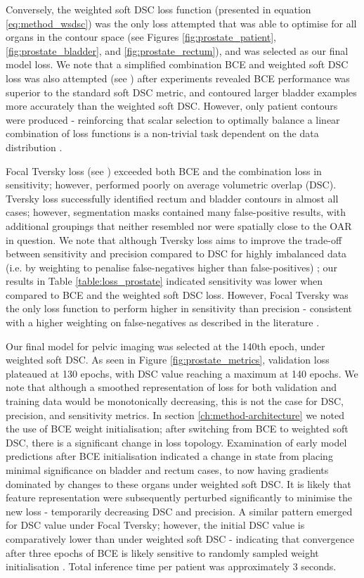 Conversely, the weighted soft DSC loss function (presented in equation \ref{eq:method_wsdsc}) was the only loss attempted that was able to optimise for all organs in the contour space (see Figures \ref{fig:prostate_patient}, \ref{fig:prostate_bladder}, and \ref{fig:prostate_rectum}), and was selected as our final model loss. We note that a simplified combination BCE and weighted soft DSC loss was also attempted (see \cite{taghanaki2018}) after experiments revealed BCE performance was superior to the standard soft DSC metric, and contoured larger bladder examples more accurately than the weighted soft DSC. However, only patient contours were produced - reinforcing that scalar selection to optimally balance a linear combination of loss functions is a non-trivial task dependent on the data distribution \cite{Bertels2019}. 
 
Focal Tversky loss (see \cite{Khan2019}) exceeded both BCE and the combination loss in sensitivity; however, performed poorly on average volumetric overlap (DSC). Tversky loss successfully identified rectum and bladder contours in almost all cases; however, segmentation masks contained many false-positive results, with additional groupings that neither resembled nor were spatially close to the OAR in question. We note that although Tversky loss aims to improve the trade-off between sensitivity and precision compared to DSC for highly imbalanced data (i.e. by weighting to penalise false-negatives higher than false-positives) \cite{taghanaki2018}; our results in Table \ref{table:loss_prostate} indicated sensitivity was lower when compared to BCE and the weighted soft DSC loss. However, Focal Tversky was the only loss function to perform higher in sensitivity than precision - consistent with a higher weighting on false-negatives as described in the literature \cite{Khan2019}.



Our final model for pelvic imaging was selected at the 140th epoch, under weighted soft DSC. As seen in Figure \ref{fig:prostate_metrics}, validation loss plateaued at 130 epochs, with DSC value reaching a maximum at 140 epochs. We note that although a smoothed representation of loss for both validation and training data would be monotonically decreasing, this is not the case for DSC, precision, and sensitivity metrics. In section \ref{ch:method-architecture} we noted the use of BCE weight initialisation; after switching from BCE to weighted soft DSC, there is a significant change in loss topology. Examination of early model predictions after BCE initialisation indicated a change in state from placing minimal significance on bladder and rectum cases, to now having gradients dominated by changes to these organs under weighted soft DSC. It is likely that feature representation were subsequently perturbed significantly to minimise the new loss - temporarily decreasing DSC and precision. A similar pattern emerged for DSC value under Focal Tversky; however, the initial DSC value is comparatively lower than under weighted soft DSC - indicating that convergence after three
epochs of BCE is likely sensitive to randomly sampled weight initialisation \cite{Ronneberger_2015}. Total inference time per patient was approximately 3 seconds.


